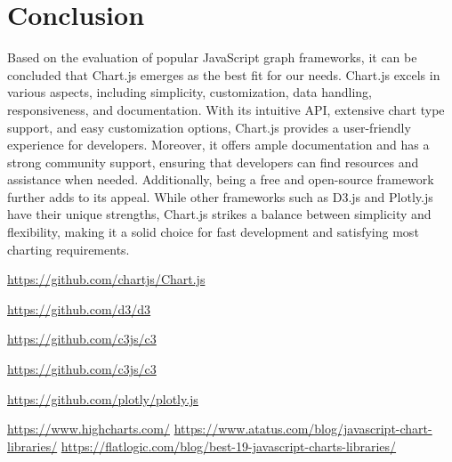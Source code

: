 \documentclass[a4paper, 11pt]{article}
\begin{document}
\section{Conclusion}

Based on the evaluation of popular JavaScript graph frameworks, it can be concluded that Chart.js emerges as the best fit for our needs. Chart.js excels in various aspects, including simplicity, customization, data handling, responsiveness, and documentation. With its intuitive API, extensive chart type support, and easy customization options, Chart.js provides a user-friendly experience for developers. Moreover, it offers ample documentation and has a strong community support, ensuring that developers can find resources and assistance when needed. Additionally, being a free and open-source framework further adds to its appeal. While other frameworks such as D3.js and Plotly.js have their unique strengths, Chart.js strikes a balance between simplicity and flexibility, making it a solid choice for fast development and satisfying most charting requirements.


\begin{thebibliography}{9}
\url{https://github.com/chartjs/Chart.js}

\url{https://github.com/d3/d3}

\url{https://github.com/c3js/c3}

\url{https://github.com/c3js/c3}

\url{https://github.com/plotly/plotly.js}

\url{https://www.highcharts.com/}
\url{https://www.atatus.com/blog/javascript-chart-libraries/}
\url{https://flatlogic.com/blog/best-19-javascript-charts-libraries/}

\end{thebibliography}
\end{document}

